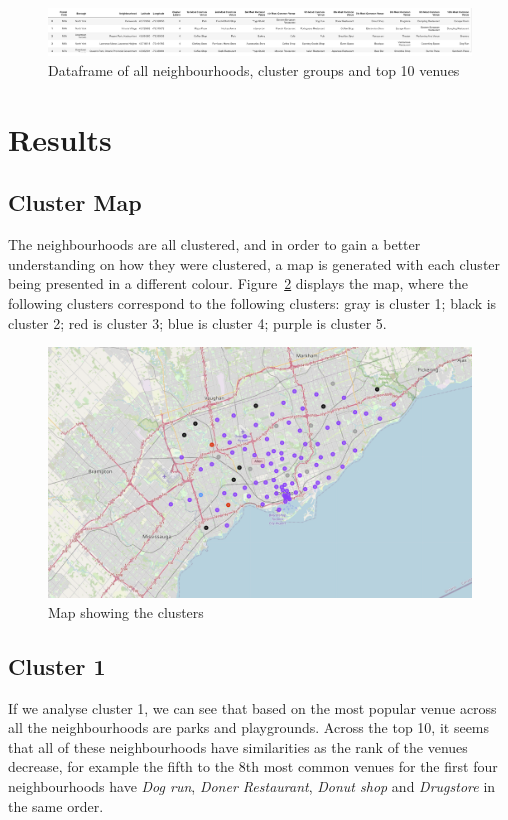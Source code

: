 \documentclass[12pt, conference]{IEEEtran}
\begin{document}
\begin{figure}[!h]
\center
\includegraphics[scale=0.37]{ClusterTable}
\caption{Dataframe of all neighbourhoods, cluster groups and top 10 venues}
\label{fig: ClusterTable}
\end{figure}

\section{\textbf{Results}}
\label{sec: Reuslts}

\subsection{Cluster Map}
The neighbourhoods are all clustered, and in order to gain a better understanding on how they were clustered, a map is generated with each cluster being presented in a different colour. Figure~\ref{fig: ClusterMap} displays the map, where the following clusters correspond to the following clusters: gray is cluster 1; black is cluster 2; red is cluster 3; blue is cluster 4; purple is cluster 5.

\begin{figure}[!h]
\center
\includegraphics[scale=0.4]{ClusterMap}
\caption{Map showing the clusters}
\label{fig: ClusterMap}
\end{figure}

\subsection{Cluster 1}
If we analyse cluster 1, we can see that based on the most popular venue across all the neighbourhoods are parks and playgrounds. Across the top 10, it seems that all of these neighbourhoods have similarities as the rank of the venues decrease, for example the fifth to the 8th most common venues for the first four neighbourhoods have \textit{Dog run}, \textit{Doner Restaurant}, \textit{Donut shop} and \textit{Drugstore} in the same order.
\end{document}
